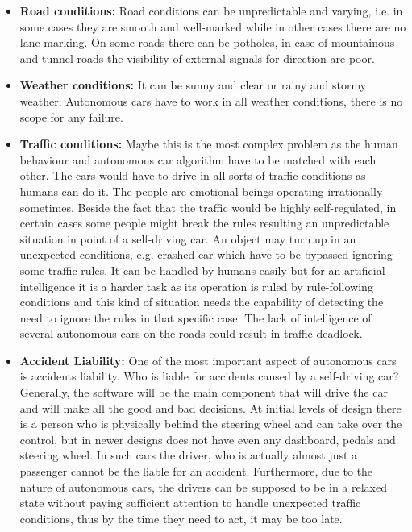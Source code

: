 \documentclass[12pt,english]{article}
\begin{document}
\begin{itemize}
	\item  \textbf{Road conditions:} 
	Road conditions can be unpredictable and varying, i.e. in some cases they are smooth and well-marked while in other cases there are no lane marking. On some roads there can be potholes, in case of mountainous and tunnel roads the visibility of external signals for direction are poor.
	
	\item 	\textbf{Weather conditions:}
	It can be sunny and clear or rainy and stormy weather. Autonomous cars have to work in all weather conditions, there is no scope for any failure.
	
	\item \textbf{Traffic conditions:}
	Maybe this is the most complex problem as the human behaviour and autonomous car algorithm have to be matched with each other. The cars would have to drive in all sorts of traffic conditions as humans can do it. The people are emotional beings operating irrationally sometimes. Beside the fact that the traffic would be highly self-regulated, in certain cases some people might break the rules resulting an unpredictable situation in point of a self-driving car. An object may turn up in an unexpected conditions, e.g. crashed car which have to be bypassed ignoring some traffic rules. It can be handled by humans easily but for an artificial intelligence it is a harder task as its operation is ruled by rule-following conditions and this kind of situation needs the capability of detecting the need to ignore the rules in that specific case. The lack of intelligence of several autonomous cars on the roads could result in traffic deadlock.
	
	\item \textbf{Accident Liability:}
	One of the most important aspect of autonomous cars is accidents liability. Who is liable for accidents caused by a self-driving car?
	Generally, the software will be the main component that will drive the car and will make all the good and bad decisions. At initial levels of design there is a person who is physically behind the steering wheel and can take over the control, but in newer designs does not have even any dashboard, pedals and steering wheel. In such cars the driver, who is actually almost just a passenger cannot be the liable for an accident. Furthermore, due to the nature of autonomous cars, the drivers can be supposed to be in a relaxed state without paying sufficient attention to handle unexpected traffic conditions, thus by the time they need to act, it may be too late.
	

\end{itemize}
\end{document}
